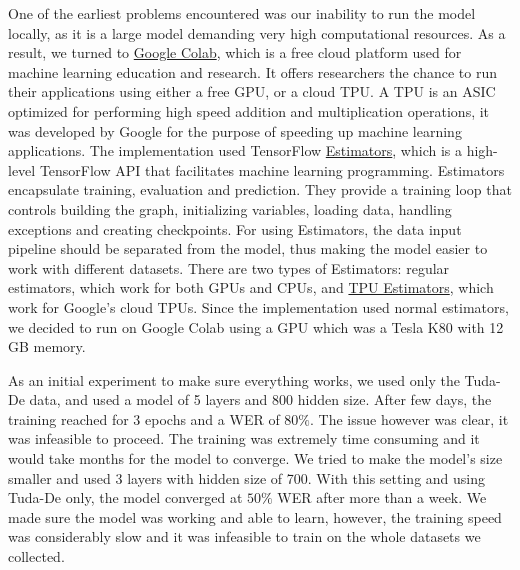 One of the earliest problems encountered was our inability to run the model locally, as it is a large model demanding very high computational resources. As a result, we turned to \href{https://colab.research.google.com/}{Google Colab}, which is a free cloud platform used for machine learning education and research. It offers researchers the chance to run their applications using either a free GPU, or a cloud \ac{TPU}. A \ac{TPU} is an \ac{ASIC} optimized for performing high speed addition and multiplication operations, it was developed by Google for the purpose of speeding up machine learning applications. The implementation used TensorFlow \href{https://www.tensorflow.org/guide/estimators}{Estimators}, which is a high-level TensorFlow API that facilitates machine learning programming. Estimators encapsulate training, evaluation and prediction. They provide a training loop that controls building the graph, initializing variables, loading data, handling exceptions and creating checkpoints. For using Estimators, the data input pipeline should be separated from the model, thus making the model easier to work with different datasets. There are two types of Estimators: regular estimators, which work for both GPUs and CPUs, and \href{URL}{TPU Estimators}, which work for Google's cloud \ac{TPU}s. Since the implementation used normal estimators, we decided to run on Google Colab using a GPU which was a Tesla K80 with 12 GB memory.


As an initial experiment to make sure everything works, we used only the Tuda-De data, and used a model of 5 layers and 800 hidden size. After few days, the training reached for 3 epochs and a \ac{WER} of $80\%$. The issue however was clear, it was infeasible to proceed. The training was extremely time consuming and it would take months for the model to converge. We tried to make the model's size smaller and used 3 layers with hidden size of 700. With this setting and using Tuda-De only, the model converged at $50\%$ \ac{WER} after more than a week. We made sure the model was working and able to learn, however, the training speed was considerably slow and it was infeasible to train on the whole datasets we collected.


